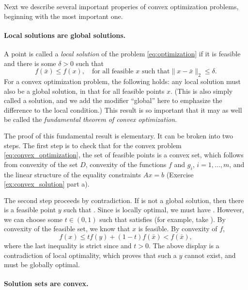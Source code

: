 Next we describe several important properies of convex optimization problems,
beginning with the most important one.

\paragraph{Local solutions are global solutions.} 

A point  is called a \emph{local solution} of the problem
\eqref{eq:optimization} if it is feasible and there is some $\delta>0$ such that 
\[
f(\bar{x}) \leq f(x), \quad \text{for all feasible $x$ such that
$\|x - \bar{x}\|_2 \leq \delta$}.
\]
For a convex optimization problem, the following holds: any local solution
 must also be a global solution, in that  for all feasible points $x$. (This is also simply called a
solution, and we add the modifier ``global'' here to emphasize the difference to
the local condition.) This result is so important that it may as well be called
the \emph{fundamental theorem of convex optimization}. 

The proof of this fundamental result is elementary. It can be broken into two  
steps. The first step is to check that for the convex problem
\eqref{eq:convex_optimization}, the set of feasible points is a convex set,
which follows from convexity of the set $D$, convexity of the functions $f$ and
$g_i$, $i=1,\ldots,m$, and the linear structure of the equality constraints 
$Ax=b$ (Exercise \ref{ex:convex_solution} part a).  

The second step proceeds by contradiction. If  is not a global
solution, then there is a feasible point $y$ such that . Since  is locally optimal, we must have
. However, we can choose some $t \in (0,1)$ 
such that  satisfies  (for example, take ).
By convexity of the feasible set, we know that $x$ is feasible. By convexity of
$f$,  
\[
f(x) \leq t f(y) + (1-t) f(\bar{x}) < f(\bar{x}),
\]
where the last inequality is strict since  and
$t>0$. The above display is a contradiction of local optimality, which proves
that such a $y$ cannot exist, and  must be globally optimal. 

\paragraph{Solution sets are convex.} 

